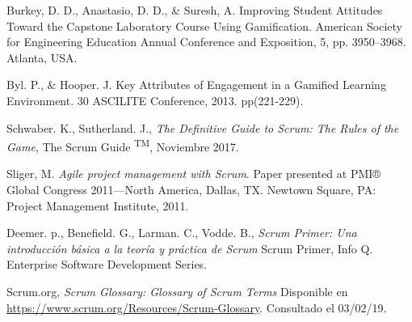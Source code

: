 \begin{thebibliography}{9}
        Burkey, D. D., Anastasio, D. D., \& Suresh, A.
        Improving Student Attitudes Toward the Capstone Laboratory Course Using Gamification.
        American Society for Engineering Education Annual Conference and Exposition, 5, pp. 3950–3968. Atlanta, USA.

        Byl. P., \& Hooper. J.
        Key Attributes of Engagement in a Gamified Learning Environment.
        30 ASCILITE Conference, 2013. pp(221-229).





        Schwaber. K., Sutherland. J.,
        {\it The Definitive Guide to Scrum: The Rules of the Game},
        The Scrum Guide \textsuperscript{TM}, Noviembre 2017.

        Sliger, M.
        {\it Agile project management with Scrum}.
        Paper presented at PMI® Global Congress 2011—North America, Dallas, TX. Newtown Square, PA: Project Management Institute, 2011.
        
        Deemer. p., Benefield. G., Larman. C., Vodde. B.,
        {\it Scrum Primer: Una introducción básica a la teoría y práctica de Scrum}
        Scrum Primer, Info Q. Enterprise Software Development Series.

        Scrum.org,
        {\it Scrum Glossary: Glossary of Scrum Terms}
        Disponible en \url{https://www.scrum.org/Resources/Scrum-Glossary}. Consultado el 03/02/19.



\end{thebibliography}
